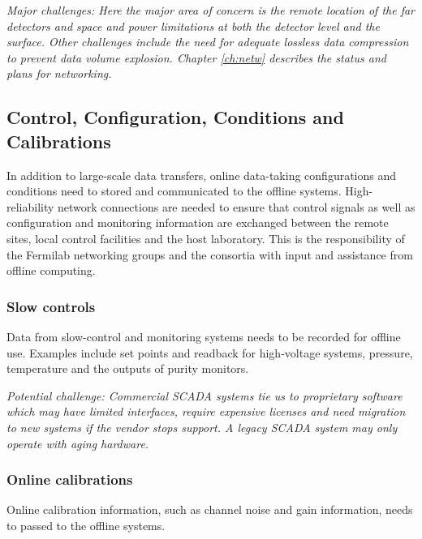 \documentclass[../main-v1.tex]{subfiles}
\begin{document}
{\it Major challenges: Here the major area of concern is the remote location of the far detectors and space and power limitations at both the detector level and the surface. Other challenges include  the need for adequate lossless data compression to prevent data volume explosion. Chapter \ref{ch:netw} describes the status and plans for networking.}

\subsection{Control, Configuration, Conditions and Calibrations}
In addition to large-scale data transfers, online data-taking configurations and conditions need to stored and communicated to the offline systems. High-reliability network connections are needed to ensure that control signals as well as configuration and monitoring information are exchanged between the remote sites, local control facilities and the host laboratory.
This is the responsibility of the Fermilab networking groups and the  consortia with input and assistance from offline computing. 


\subsubsection{Slow controls}
Data from slow-control and monitoring systems needs to be recorded for offline use.  Examples include set points and readback for high-voltage systems, pressure, temperature and the outputs of purity monitors. 

{\it Potential challenge: Commercial SCADA systems tie us to proprietary software which may have limited interfaces, require expensive licenses and need migration to new systems if the vendor stops support.  A legacy SCADA system may only operate with aging hardware.}

\subsubsection{Online calibrations}
Online calibration information, such as channel noise and gain information, needs to passed to the offline systems. 
\end{document}
